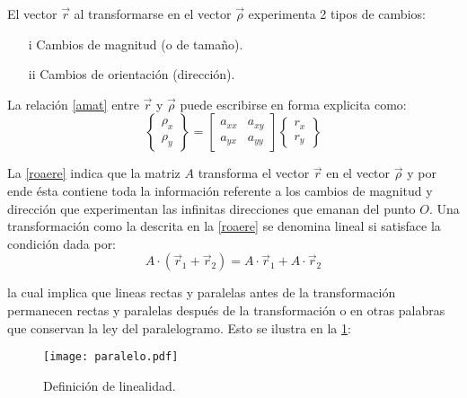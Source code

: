 \documentclass[../notas medios.tex]{subfiles}
\begin{document}
El vector $\vec{r}$ al transformarse en el vector $\vec{\rho}$ experimenta 2 tipos de cambios:
\begin{itemize}
\item[i] Cambios de magnitud (o de tamaño).
\item[ii] Cambios de orientación (dirección). 
\end{itemize}

La relación \cref{amat} entre $\vec{r}$ y $\vec{\rho}$ puede escribirse en forma explicita como:
\begin{equation}
\left\{ {\begin{array}{*{20}{c}}
{{\rho _x}}\\
{{\rho _y}}
\end{array}} \right\} = \left[ {\begin{array}{*{20}{c}}
{{a_{xx}}}&{{a_{xy}}}\\
{{a_{yx}}}&{{a_{yy}}}
\end{array}} \right]\left\{ {\begin{array}{*{20}{c}}
{{r_x}}\\
{{r_y}}
\end{array}} \right\}
\label{roaere}
\end{equation}

La \cref{roaere} indica que la matriz $A$ transforma el vector $\vec{r}$ en el vector $\vec{\rho}$ y por ende ésta contiene toda la información referente a los cambios de magnitud y dirección que experimentan las infinitas direcciones que emanan del punto $O$. Una transformación como la descrita en la \cref{roaere} se denomina lineal si satisface la condición dada por:
\begin{equation}
A \cdot (\vec{r}_1 + \vec{r}_2) = A \cdot \vec{r}_1 + A \cdot \vec{r}_2
\label{lineal}
\end{equation}

la cual implica que lineas rectas y paralelas antes de la transformación permanecen rectas y paralelas después de la transformación o en otras palabras que conservan la ley del paralelogramo. Esto se ilustra en la \cref{paralelo}:
\begin{figure}[H]
\centering
	\texttt{[image: paralelo.pdf]}
	\caption{Definición de linealidad.}
	\label{paralelo}
\end{figure}
\end{document}

